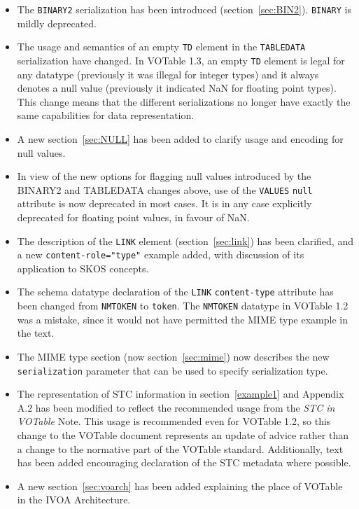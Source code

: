 \documentclass[11pt,a4paper]{ivoa}
\def\Aref#1{section~\ref{#1}}
\let\fg=\color
\def\attr#1{{\tt{\fg{DarkRed}#1}}}
\def\elem#1{{\tt{\fg{DarkRed}#1}}}
\def\attrval#1#2{{\tt{\fg{DarkRed}#1}="{\fg{DarkPurple}#2}"}}
\begin{document}
\begin{itemize}
\item The \elem{BINARY2} serialization has been introduced
      (\Aref{sec:BIN2}).
      \elem{BINARY} is mildly deprecated.
\item The usage and semantics of an empty \elem{TD} element in the
      \elem{TABLEDATA} serialization have changed.
      In VOTable 1.3, an empty \elem{TD} element is legal for any datatype
      (previously it was illegal for integer types)
      and it always denotes a null value
      (previously it indicated NaN for floating point types).
      This change means that the different serializations no longer have
      exactly the same capabilities for data representation.
\item A new \Aref{sec:NULL} has been added to clarify
      usage and encoding for null values.
\item In view of the new options for flagging null values introduced by the
      BINARY2 and TABLEDATA changes above, use of the
      \elem{VALUES} \attr{null} attribute is now deprecated in most cases.
      It is in any case explicitly deprecated for floating point values,
      in favour of NaN.
\item The description of the \elem{LINK} element (\Aref{sec:link})
      has been clarified, and a new \attrval{content-role}{type}
      example added, with discussion of its application to SKOS concepts.
\item The schema datatype declaration of the \elem{LINK} \attr{content-type}
      attribute has been changed from {\tt NMTOKEN} to {\tt token}.
      The {\tt NMTOKEN} datatype in VOTable 1.2 was a mistake, since it
      would not have permitted the MIME type example in the text.
\item The MIME type section (now \Aref{sec:mime}) now describes
      the new {\tt serialization} parameter that can be used to specify
      serialization type.
\item The representation of STC information in \Aref{example1}
      and Appendix A.2
      has been modified to reflect the recommended usage from the
      {\em STC in VOTable} Note.  This usage is recommended even for
      VOTable 1.2, so this change to the VOTable document represents
      an update of advice rather than a change to the normative part
      of the VOTable standard.  Additionally, text has been added
      encouraging declaration of the STC metadata where possible.
\item A new \Aref{sec:voarch} has been added explaining
      the place of VOTable in the IVOA Architecture.
\end{itemize}
\end{document}

